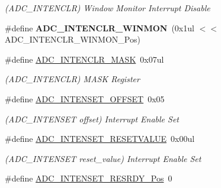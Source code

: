 \begin{DoxyCompactItemize}
\begin{DoxyCompactList}\small\item\em (A\+D\+C\+\_\+\+I\+N\+T\+E\+N\+C\+L\+R) Window Monitor Interrupt Disable \end{DoxyCompactList}\item 
\hypertarget{group___s_a_m_l21___a_d_c_gac4b4be4164b73463439cb18a227ac54c}{}\#define {\bfseries A\+D\+C\+\_\+\+I\+N\+T\+E\+N\+C\+L\+R\+\_\+\+W\+I\+N\+M\+O\+N}~(0x1ul $<$$<$ A\+D\+C\+\_\+\+I\+N\+T\+E\+N\+C\+L\+R\+\_\+\+W\+I\+N\+M\+O\+N\+\_\+\+Pos)\label{group___s_a_m_l21___a_d_c_gac4b4be4164b73463439cb18a227ac54c}

\item 
\hypertarget{group___s_a_m_l21___a_d_c_ga86fb35a78836c2ee97ccaa2801bcf8da}{}\#define \hyperlink{group___s_a_m_l21___a_d_c_ga86fb35a78836c2ee97ccaa2801bcf8da}{A\+D\+C\+\_\+\+I\+N\+T\+E\+N\+C\+L\+R\+\_\+\+M\+A\+S\+K}~0x07ul\label{group___s_a_m_l21___a_d_c_ga86fb35a78836c2ee97ccaa2801bcf8da}

\begin{DoxyCompactList}\small\item\em (A\+D\+C\+\_\+\+I\+N\+T\+E\+N\+C\+L\+R) M\+A\+S\+K Register \end{DoxyCompactList}\item 
\hypertarget{group___s_a_m_l21___a_d_c_ga0b570aa514a0e36e01952c41e02df429}{}\#define \hyperlink{group___s_a_m_l21___a_d_c_ga0b570aa514a0e36e01952c41e02df429}{A\+D\+C\+\_\+\+I\+N\+T\+E\+N\+S\+E\+T\+\_\+\+O\+F\+F\+S\+E\+T}~0x05\label{group___s_a_m_l21___a_d_c_ga0b570aa514a0e36e01952c41e02df429}

\begin{DoxyCompactList}\small\item\em (A\+D\+C\+\_\+\+I\+N\+T\+E\+N\+S\+E\+T offset) Interrupt Enable Set \end{DoxyCompactList}\item 
\hypertarget{group___s_a_m_l21___a_d_c_ga26f1d6d4ed9e9e0440a649b4cc89e3bb}{}\#define \hyperlink{group___s_a_m_l21___a_d_c_ga26f1d6d4ed9e9e0440a649b4cc89e3bb}{A\+D\+C\+\_\+\+I\+N\+T\+E\+N\+S\+E\+T\+\_\+\+R\+E\+S\+E\+T\+V\+A\+L\+U\+E}~0x00ul\label{group___s_a_m_l21___a_d_c_ga26f1d6d4ed9e9e0440a649b4cc89e3bb}

\begin{DoxyCompactList}\small\item\em (A\+D\+C\+\_\+\+I\+N\+T\+E\+N\+S\+E\+T reset\+\_\+value) Interrupt Enable Set \end{DoxyCompactList}\item 
\hypertarget{group___s_a_m_l21___a_d_c_ga264acd7684104056b02d545b737b9b6c}{}\#define \hyperlink{group___s_a_m_l21___a_d_c_ga264acd7684104056b02d545b737b9b6c}{A\+D\+C\+\_\+\+I\+N\+T\+E\+N\+S\+E\+T\+\_\+\+R\+E\+S\+R\+D\+Y\+\_\+\+Pos}~0\label{group___s_a_m_l21___a_d_c_ga264acd7684104056b02d545b737b9b6c}


\end{DoxyCompactItemize}
